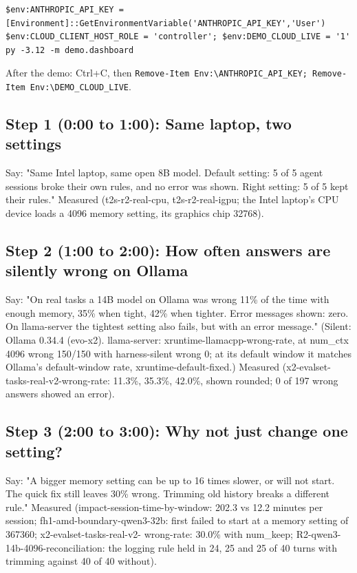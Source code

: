 \begin{verbatim}
$env:ANTHROPIC_API_KEY = [Environment]::GetEnvironmentVariable('ANTHROPIC_API_KEY','User')
$env:CLOUD_CLIENT_HOST_ROLE = 'controller'; $env:DEMO_CLOUD_LIVE = '1'
py -3.12 -m demo.dashboard
\end{verbatim}

After the demo: Ctrl+C, then \texttt{Remove-\allowbreak{}Item Env:\allowbreak{}\textbackslash{}ANTHROPIC\_\allowbreak{}API\_\allowbreak{}KEY; Remove-\allowbreak{}Item Env:\allowbreak{}\textbackslash{}DEMO\_\allowbreak{}CLOUD\_\allowbreak{}LIVE}.

\subsection*{Step 1 (0:00 to 1:00): Same laptop, two settings}

Say: "Same Intel laptop, same open 8B model. Default setting: 5 of 5 agent sessions broke their own rules, and no error
was shown. Right setting: 5 of 5 kept their rules." Measured (t2s-r2-real-cpu, t2s-r2-real-igpu; the Intel laptop's
CPU device loads a 4096 memory setting, its graphics chip 32768).

\subsection*{Step 2 (1:00 to 2:00): How often answers are silently wrong on Ollama}

Say: "On real tasks a 14B model on Ollama was wrong 11\% of the time with enough memory, 35\% when tight, 42\% when
tighter. Error messages shown: zero. On llama-server the tightest setting also fails, but with an error message."
(Silent: Ollama 0.34.4 (evo-x2). llama-server: xruntime-llamacpp-wrong-rate, at num\_ctx 4096 wrong 150/150 with
harness-silent wrong 0; at its default window it matches Ollama's default-window rate, xruntime-default-fixed.) Measured (x2-evalset-tasks-real-v2-wrong-rate: 11.3\%, 35.3\%, 42.0\%, shown rounded; 0 of 197
wrong answers showed an error).

\subsection*{Step 3 (2:00 to 3:00): Why not just change one setting?}

Say: "A bigger memory setting can be up to 16 times slower, or will not start. The quick fix still leaves 30\% wrong.
Trimming old history breaks a different rule." Measured (impact-session-time-by-window: 202.3 vs 12.2 minutes per
session; fh1-amd-boundary-qwen3-32b: first failed to start at a memory setting of 367360; x2-evalset-tasks-real-v2-
wrong-rate: 30.0\% with num\_keep; R2-qwen3-14b-4096-reconciliation: the logging rule held in 24, 25 and 25 of 40 turns
with trimming against 40 of 40 without).

